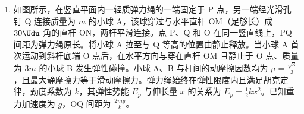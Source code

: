 \documentclass[\gkver]{gaokaozhenti}
\begin{document}
\begin{enumerate}
\begin{enumerate}
\item
求水的折射率；
\item
若激光从水面下射向该球壳，当光线恰好不能从液面上方的半球壳射出时，求此时光线与水面的夹角。
\end{enumerate}

\onepicture[align=right, w=5.19cm]{}


\item
如图所示，在竖直平面内一轻质弹力绳的一端固定于 P 点，另一端经光滑孔钉 Q 连接质量为 $m$ 的小球 A，该球穿过与水平直杆 OM（足够长）成 $30\Udu$ 角的直杆 ON，两杆平滑连接。点 P、Q 和 O 在同一竖直线上，PQ 间距为弹力绳原长。将小球 A 拉至与 Q 等高的位置由静止释放。当小球 A 首次运动到斜杆底端 O 点后，在水平方向与穿在直杆 OM 且静止于 O 点、质量为 $3m$ 的小球 B 发生弹性碰撞。小球 A、B 与杆间的动摩擦因数均为 $\mu = \frac{\sqrt{3}}{3}$，且最大静摩擦力等于滑动摩擦力。弹力绳始终在弹性限度内且满足胡克定律，劲度系数为 $k$，其弹性势能 $E_{p}$ 与伸长量 $x$ 的关系为 $E_{p} = \frac{1}{2}kx^{2}$。已知重力加速度为 $g$，OQ 间距为 $\frac{2mg}{k}$。


\end{enumerate}
\end{document}

